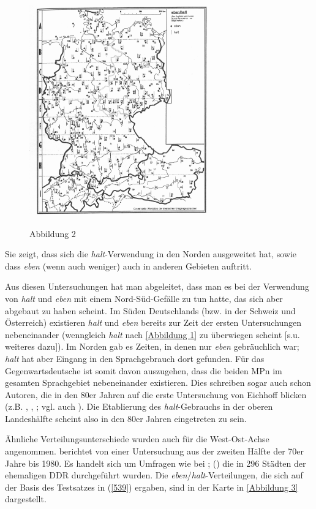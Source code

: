 \begin{figure}[h]
\includegraphics[width=0.7\textwidth]{he2.png}
\caption{Abbildung 2}
\label{Abbildung 2}
\hbox{}\hfill\hbox{\citet[51]{Elspass2005}}
\end{figure}
\noindent
Sie zeigt, dass sich die \textit{halt}-Verwendung in den Norden ausgeweitet hat, sowie dass \textit{eben} (wenn auch weniger) auch in anderen Gebieten auftritt.

Aus diesen Untersuchungen hat man abgeleitet, dass man es bei der Verwendung von \textit{halt} und \textit{eben} mit einem Nord-Süd-Gefälle zu tun hatte, das sich aber abgebaut zu haben scheint. Im Süden Deutschlands (bzw. in der Schweiz und Österreich) existieren \textit{halt} und \textit{eben} bereits zur Zeit der ersten Untersuchungen nebeneinander (wenngleich \textit{halt} nach \ref{Abbildung 1} zu überwiegen scheint $[$s.u. weiteres dazu$]$). Im Norden gab es Zeiten, in denen nur \textit{eben} gebräuchlich war; \textit{halt} hat aber Eingang in den Sprachgebrauch dort gefunden. Für das Gegenwartsdeutsche ist somit davon auszugehen, dass die beiden MPn im gesamten Sprachgebiet nebeneinander existieren. Dies schreiben sogar auch schon Autoren, die in den 80er Jahren auf die erste Untersuchung von Eichhoff blicken (z.B. \citealt[78]{Hartog1982}, \citealt[97]{Dahl1988}, \citealt[124]{Thurmair1989}; vgl. auch \citealt[93]{Autenrieth2002}). Die Etablierung des \textit{halt}-Gebrauchs in der oberen Landeshälfte scheint also in den 80er Jahren eingetreten zu sein.

Ähnliche Verteilungsunterschiede wurden auch für die West-Ost-Achse ange\-nommen. \citet{Protze1997} berichtet von einer Untersuchung aus der zweiten Hälfte der 70er Jahre bis 1980. Es handelt sich um Umfragen wie bei \citet{Eichhoff1977}; (\citeyear{Eichhoff1978}) die in 296 Städten der ehemaligen DDR durchgeführt wurden. Die \textit{eben}/\textit{halt}-Verteilungen, die sich auf der Basis des Testsatzes in (\ref{539}) ergaben, sind in der Karte in \ref{Abbildung 3} dargestellt.

